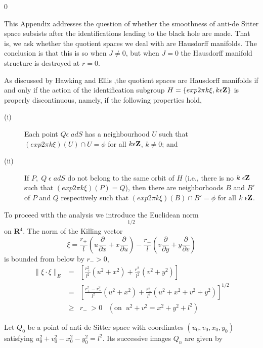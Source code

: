 \documentclass[12pt]{article}
\newcounter{c1} \newcounter{c2}
\renewcommand{\theequation}{\thesection.\arabic{equation}}
\newcommand{\bb}{\begin{equation}}
\newcommand{\ee}{\end{equation}}
\newcommand{\p}{\partial}
\newcommand{\br}{\begin{eqnarray}}
\newcommand{\er}{\end{eqnarray}}
\begin{document}

\renewcommand{\theequation}{B.\arabic{equation}}
\setcounter{equation} 0


This Appendix addresses the question of whether the smoothness
of anti-de Sitter space subsists after the identifications
leading to the black hole are made. That is, we ask whether the
quotient spaces we deal with are Hausdorff manifolds. The
conclusion is that this is so when $J \neq 0$, but when $J=0$
the Hausdorff manifold structure is destroyed at $r=0$.

As discussed by Hawking and Ellis \cite{9},the quotient spaces are Hausdorff
manifolds if and only if the action of the identification
subgroup $H = \{ exp 2\pi k\xi, k\epsilon {\bf Z} \}$ is
properly discontinuous, namely, if the following properties hold,


\begin{description}
 \item [(i)] Each point $Q \epsilon \; adS $ has a neighbourhood
	$U$ such that $(exp 2\pi k\xi)(U) \cap U = \phi$ for all $k
	\epsilon {\bf Z}$, $k \neq 0$; and

 \item [(ii)] If $P,\; Q \; \epsilon \; adS $ do not belong to the
	same orbit of $H$ (i.e., there is no $k\; \epsilon {\bf
	Z}$ such that $(exp 2\pi k \xi)(P) =Q$), then there are
	neighborhoods $B$ and $B'$ of $P$ and $Q$ respectively such
	that $(exp 2\pi k \xi)(B) \cap B' =\phi$ for all $k\;
	\epsilon {\bf Z}$.
\end{description}

To proceed with the analysis we introduce the Euclidean norm
\bb
[(u'-u)^2 + (v'-v)^2 +(x'-x)^2 +(y'-y)^2]^{1/2}
\ee
%
on {\bf R}$^4$. The norm of the Killing vector
\bb
\xi= \frac{r_+}{l}\left( u\frac{\p}{\p x}+x\frac{\p}{\p u}
\right) - \frac{r_-}{l}\left( v\frac{\p}{\p y} + y\frac{\p}{\p v}
\right)
\ee
%
is bounded from below by $r_- >0$,
\br
\parallel \xi\cdot\xi\parallel_{E} &=& \left[
\frac{r_+^2}{l^2}(u^2 +x^2) +\frac{r_-^2}{l^2}(v^2 +y^2) \right]
\nonumber \\
&=& \left[ \frac{r_+^2 -r_-^2}{l^2}(u^2 +x^2) +\frac{r_-^2}{l^2}
(u^2 +x^2 +v^2 +y^2) \right]^{1/2} \nonumber \\
&\geq & r_- \;>0 \;\;\; (\mbox{on}\;\; u^2 +v^2 =x^2 +y^2 +l^2)
\label{b.1}
\er

Let $Q_0$ be a point of anti-de Sitter space with coordinates $(u_0, v_0, x_0,
 y_0)$ satisfying $u^2_0 + v^2_0 - x^2_0 - y^2_0 = l^2$.
Its successive images $Q_{n}$ are given by
\end{document}
